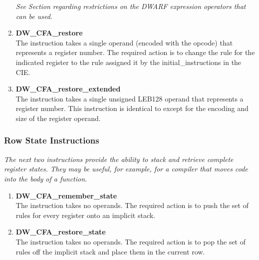 \begin{enumerate}[1. ]
\textit{See Section  
regarding restrictions on the DWARF
expression operators that can be used.}

\item \textbf{ DW\_CFA\_restore} \\
The  instruction takes a single operand (encoded
with the opcode) that represents a register number. The
required action is to change the rule for the indicated
register to the rule assigned it by the initial\_instructions
in the CIE.

\item \textbf{DW\_CFA\_restore\_extended} \\
The 
instruction takes a single unsigned LEB128 
operand that represents a register number. This
instruction is identical to  except for the
encoding and size of the register operand.

\end{enumerate}

\subsubsection{Row State Instructions}
\label{chap:rowstateinstructions}

\textit{The next two instructions provide the ability to stack and
retrieve complete register states. They may be useful, for
example, for a compiler that moves  code 
into the
body of a function.}


\begin{enumerate}[1. ]

\item \textbf{DW\_CFA\_remember\_state} \\
The  instruction takes no operands. The
required action is to push the set of rules for every register
onto an implicit stack.

\item \textbf{DW\_CFA\_restore\_state} \\
The  instruction takes no operands. The
required action is to pop the set of rules off the implicit
stack and place them in the current row.

\end{enumerate}

